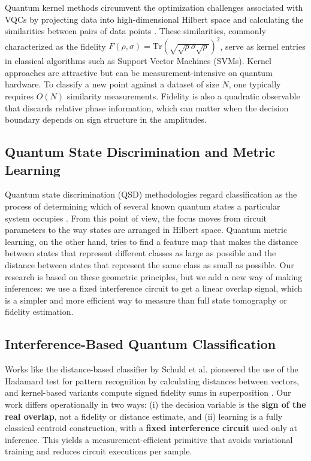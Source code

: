\documentclass[conference]{IEEEtran}
\begin{document}
Quantum kernel methods circumvent the optimization challenges associated with VQCs by projecting data into high-dimensional Hilbert space and calculating the similarities between pairs of data points \cite{schuld2019feature,havlicek2019supervised}. These similarities, commonly characterized as the fidelity $F(\rho, \sigma) = \text{Tr}(\sqrt{\sqrt{\rho}\sigma\sqrt{\rho}})^2$, serve as kernel entries in classical algorithms such as Support Vector Machines (SVMs). Kernel approaches are attractive but can be measurement-intensive on quantum hardware. To classify a new point against a dataset of size $N$, one typically requires $O(N)$ similarity measurements. Fidelity is also a quadratic observable that discards relative phase information, which can matter when the decision boundary depends on sign structure in the amplitudes.

\subsection{Quantum State Discrimination and Metric Learning}

Quantum state discrimination (QSD) methodologies regard classification as the process of determining which of several known quantum states a particular system occupies \cite{sergioli2019binary,gonzalez2021classification}. From this point of view, the focus moves from circuit parameters to the way states are arranged in Hilbert space. Quantum metric learning, on the other hand, tries to find a feature map that makes the distance between states that represent different classes as large as possible and the distance between states that represent the same class as small as possible. Our research is based on these geometric principles, but we add a new way of making inferences: we use a fixed interference circuit to get a linear overlap signal, which is a simpler and more efficient way to measure than full state tomography or fidelity estimation.

\subsection{Interference-Based Quantum Classification}

Works like the distance-based classifier by Schuld et al. \cite{schuld2017distance,schuld2018book} pioneered the use of the Hadamard test for pattern recognition by calculating distances between vectors, and kernel-based variants compute signed fidelity sums in superposition \cite{blank2020kernel,blank2022compact}. Our work differs operationally in two ways: (i) the decision variable is the \textbf{sign of the real overlap}, not a fidelity or distance estimate, and (ii) learning is a fully classical centroid construction, with a \textbf{fixed interference circuit} used only at inference. This yields a measurement-efficient primitive that avoids variational training and reduces circuit executions per sample.
\end{document}
